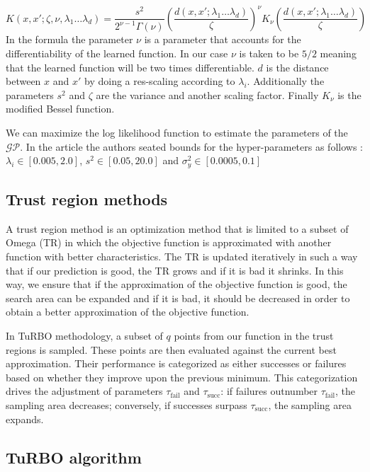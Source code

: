 \documentclass[sigconf]{acmart}
\begin{document}
$$
K(x, x' ; \zeta, \nu, \lambda_1 \dots \lambda_d)=\frac{s^2}{2^{\nu-1} \Gamma(\nu)}\left(\frac{d(x, x' ; \lambda_1 \dots \lambda_d)}{\zeta}\right)^\nu K_\nu\left(\frac{d(x, x' ; \lambda_1 \dots \lambda_d)}{\zeta}\right)
$$
In the formula the parameter $\nu $ is a parameter that accounts for the differentiability of the learned function. In our case $\nu$ is taken to be $5/2$ meaning that the learned function will be two times differentiable. $d$ is the distance between $x$ and $x'$ by doing a res-scaling according to $\lambda_{i}$. Additionally the parameters $s^2$ and $\zeta$ are the variance and another scaling factor. Finally $K_{\nu}$ is the modified Bessel function. 

 We can maximize the log likelihood function to estimate the parameters of the $\mathcal{GP}$. In the article the authors seated bounds for the hyper-parameters as follows : $\lambda_i \in [0.005,2.0]$, $s^2 \in [0.05, 20.0]$ and $\sigma^2_y \in [0.0005,0.1]$


 

\subsection{Trust region methods}

A trust region method is an optimization method that is limited to a subset of Omega (TR) in which the objective function is approximated with another function with better characteristics. The TR is updated iteratively in such a way that if our prediction is good, the TR grows and if it is bad it shrinks. In this way, we ensure that if the approximation of the objective function is good, the search area can be expanded and if it is bad, it should be decreased in order to obtain a better approximation of the objective function.

In TuRBO methodology, a subset of $q$ points from our function in the trust regions is sampled. These points are then evaluated against the current best approximation. Their performance is categorized as either successes or failures based on whether they improve upon the previous minimum. This categorization drives the adjustment of parameters $\tau_{\text{fail}}$ and $\tau_{\text{succ}}$: if failures outnumber $\tau_{\text{fail}}$, the sampling area decreases; conversely, if successes surpass $\tau_{\text{succ}}$, the sampling area expands. 

\subsection{TuRBO algorithm}
\end{document}
